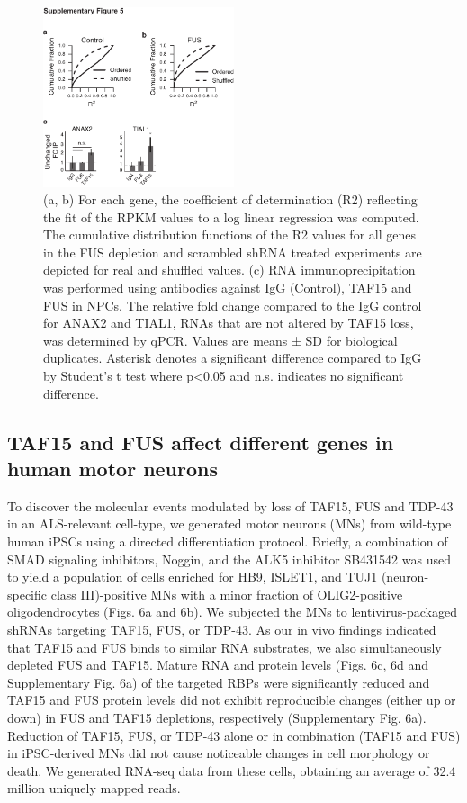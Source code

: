 \begin{figure}[ht]
  \centering
  \includegraphics[width=0.5\textwidth]{chapter_2_figures/Figure_S5}
  \caption[Supplementary Figure 5. Transcriptome-wide analysis of mRNA decay upon loss of TAF15 or FUS]{(a, b) For each gene, the coefficient of determination (R2) reflecting the fit of the RPKM values to a log linear regression was computed. The cumulative distribution functions of the R2 values for all genes in the FUS depletion and scrambled shRNA treated experiments are depicted for real and shuffled values. (c) RNA immunoprecipitation was performed using antibodies against IgG (Control), TAF15 and FUS in NPCs. The relative fold change compared to the IgG control for ANAX2 and TIAL1, RNAs that are not altered by TAF15 loss, was determined by qPCR. Values are means ± SD for biological duplicates. Asterisk denotes a significant difference compared to IgG by Student’s t test where p<0.05 and n.s. indicates no significant difference. }
  \label{fig:Figure_S5}
\end{figure}

\subsection{TAF15 and FUS affect different genes in human motor neurons}
To discover the molecular events modulated by loss of TAF15, FUS and TDP-43 in an ALS-relevant cell-type, we generated motor neurons (MNs) from wild-type human iPSCs using a directed differentiation protocol\cite{Chambers2009}. Briefly, a combination of SMAD signaling inhibitors, Noggin, and the ALK5 inhibitor SB431542 was used to yield a population of cells enriched for HB9, ISLET1, and TUJ1 (neuron-specific class III)-positive MNs with a minor fraction of OLIG2-positive oligodendrocytes (Figs. 6a and 6b). We subjected the MNs to lentivirus-packaged shRNAs targeting TAF15, FUS, or TDP-43. As our in vivo findings indicated that TAF15 and FUS binds to similar RNA substrates, we also simultaneously depleted FUS and TAF15. Mature RNA and protein levels (Figs. 6c, 6d and Supplementary Fig. 6a) of the targeted RBPs were significantly reduced and TAF15 and FUS protein levels did not exhibit reproducible changes (either up or down) in FUS and TAF15 depletions, respectively (Supplementary Fig. 6a). Reduction of TAF15, FUS, or TDP-43 alone or in combination (TAF15 and FUS) in iPSC-derived MNs did not cause noticeable changes in cell morphology or death. We generated RNA-seq data from these cells, obtaining an average of 32.4 million uniquely mapped reads.


